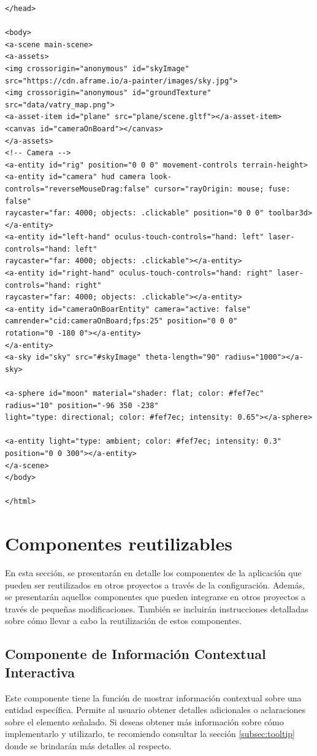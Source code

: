 \documentclass[a4paper, 11pt]{book}
\begin{document}
\begin{verbatim}
</head>

<body>
<a-scene main-scene>
<a-assets>
<img crossorigin="anonymous" id="skyImage" src="https://cdn.aframe.io/a-painter/images/sky.jpg">
<img crossorigin="anonymous" id="groundTexture" src="data/vatry_map.png">
<a-asset-item id="plane" src="plane/scene.gltf"></a-asset-item>
<canvas id="cameraOnBoard"></canvas>
</a-assets>
<!-- Camera -->
<a-entity id="rig" position="0 0 0" movement-controls terrain-height>
<a-entity id="camera" hud camera look-controls="reverseMouseDrag:false" cursor="rayOrigin: mouse; fuse: false"
raycaster="far: 4000; objects: .clickable" position="0 0 0" toolbar3d>
</a-entity>
<a-entity id="left-hand" oculus-touch-controls="hand: left" laser-controls="hand: left"
raycaster="far: 4000; objects: .clickable"></a-entity>
<a-entity id="right-hand" oculus-touch-controls="hand: right" laser-controls="hand: right"
raycaster="far: 4000; objects: .clickable"></a-entity>
<a-entity id="cameraOnBoarEntity" camera="active: false" camrender="cid:cameraOnBoard;fps:25" position="0 0 0"
rotation="0 -180 0"></a-entity>
</a-entity>
<a-sky id="sky" src="#skyImage" theta-length="90" radius="1000"></a-sky>

<a-sphere id="moon" material="shader: flat; color: #fef7ec" radius="10" position="-96 350 -238"
light="type: directional; color: #fef7ec; intensity: 0.65"></a-sphere>

<a-entity light="type: ambient; color: #fef7ec; intensity: 0.3" position="0 0 300"></a-entity>
</a-scene>
</body>

</html>
\end{verbatim}

\section{Componentes reutilizables}
\label{sec:componentesreutilizables}
En esta sección, se presentarán en detalle los componentes de la aplicación que pueden ser reutilizados en otros proyectos a través de la configuración. Además, se presentarán aquellos componentes que pueden integrarse en otros proyectos a través de pequeñas modificaciones. También se incluirán instrucciones detalladas sobre cómo llevar a cabo la reutilización de estos componentes.
\subsection{Componente de Información Contextual Interactiva}
Este componente tiene la función de mostrar información contextual sobre una entidad específica. Permite al usuario obtener detalles adicionales o aclaraciones sobre el elemento señalado. Si deseas obtener más información sobre cómo implementarlo y utilizarlo, te recomiendo consultar la sección \ref{subsec:tooltip} donde se brindarán más detalles al respecto.
\end{document}
